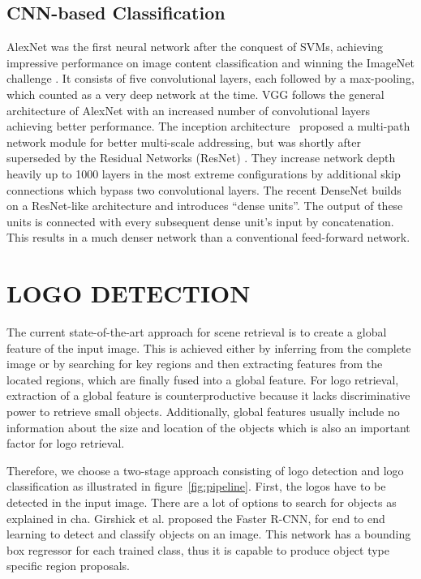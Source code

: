 \documentclass[a4paper,twoside]{article}
\begin{document}
\subsection{\acs{CNN}-based Classification}
AlexNet \cite{krizhevsky2012b} was the first neural network after the conquest of \acp{SVM}, achieving impressive performance on image content classification and winning the ImageNet challenge \cite{deng2009}. It consists of five convolutional layers, each followed by a max-pooling, which counted as a very deep network at the time. 
VGG \cite{simonyan2014} follows the general architecture of AlexNet with an increased number of convolutional layers achieving better performance. 
The inception architecture~\cite{szegedy2015} proposed a multi-path network module for better multi-scale addressing, but was shortly after superseded by the Residual Networks (ResNet) \cite{he2015,he2016}. They increase network depth heavily up to 1000 layers in the most extreme configurations by additional skip connections which bypass two convolutional layers. 
The recent DenseNet \cite{huang2016} builds on a ResNet-like architecture and introduces ``dense units''. The output of these units is connected with every subsequent dense unit's input by concatenation. This results in a much denser network than a conventional feed-forward network.


\section{\uppercase{Logo Detection}}
\noindent The current state-of-the-art approach for scene retrieval is to create a global feature of the input image. This is achieved either by inferring from the complete image or by searching for key regions and then extracting features from the located regions, which are finally fused into a global feature. For logo retrieval, extraction of a global feature is counterproductive because it lacks discriminative power to retrieve small objects. Additionally, global features usually include no information about the size and location of the objects which is also an important factor for logo retrieval.

Therefore, we choose a two-stage approach consisting of logo detection and logo classification as illustrated in figure~\ref{fig:pipeline}. First, the logos have to be detected in the input image. 
There are a lot of options to search for objects as explained in cha. Girshick et al. \cite{ren2015} proposed the Faster R-CNN, for end to end learning to detect and classify objects on an image. This network has a bounding box regressor for each trained class, thus it is capable to produce object type specific region proposals.
\end{document}
